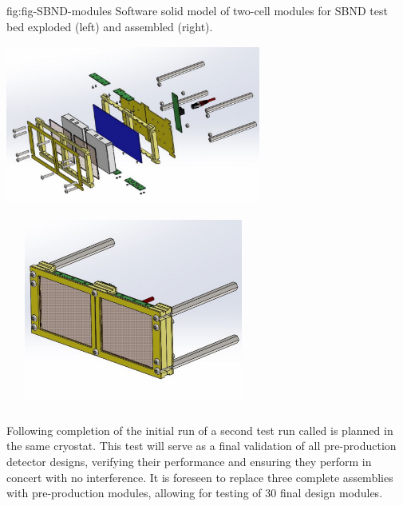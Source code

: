 \begin{dunefigure}
 {fig:fig-SBND-modules}
 {Software solid model of two-cell  modules for SBND test bed exploded (left) and assembled (right).}
\includegraphics[angle=0,width=8.4cm,height=6cm]{graphics/pds-sbnd-xarapu-exploded.pdf}
\includegraphics[angle=0,width=8.4cm,height=6cm]{graphics/pds-sbnd-xarapu-assembled.pdf}
\end{dunefigure}



\subsubsection{}
\label{sec:valid-pdune2}


Following completion of the initial run of  a second test run called  is planned in the same cryostat.  This test will serve as a final validation of all pre-production  detector designs, verifying their performance and ensuring they perform in concert with no interference.  It is foreseen to replace three complete  assemblies with pre-production modules, allowing for testing of 30 final design  modules.  

